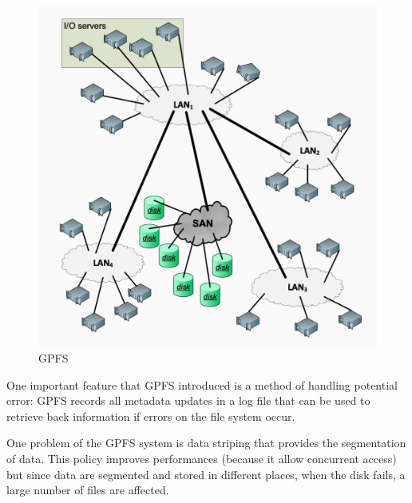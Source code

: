 \begin{figure}[h!]
    \centering
    \includegraphics[scale=0.35]{images/GPFS.png}
    \caption{GPFS}
    \label{fig:gpfs}
\end{figure}

One important feature that GPFS introduced is a method of handling potential error: GPFS records all metadata updates in a log file that can be used to retrieve back information if errors on the file system occur.

One problem of the GPFS system is data striping that provides the segmentation of data. This policy improves performances (because it allow concurrent access) but since data are segmented and stored in different places, when the disk fails, a large number of files are affected.


